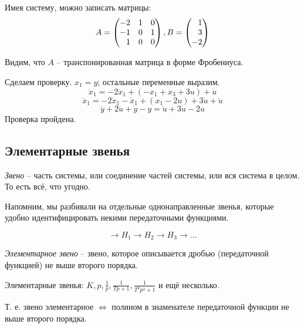 \documentclass[main.tex]{subfiles}
\begin{document}
Имея систему, можно записать матрицы:
\[ A = \begin{pmatrix}
    - 2 & 1 & 0 \\
    -1 & 0 & 1 \\
    \phm 1 & 0 & 0
\end{pmatrix}, B = \begin{pmatrix}
\phm 1 \\ \phm 3 \\ -2
\end{pmatrix} \]

Видим, что $ A $ -- транспонированная матрица в форме Фробениуса.

Сделаем проверку.
$ x_1 = y $; остальные переменные выразим.
\[ \ddot x_1 = -2 \dot x_1 + (- x_1 + x_3 + 3u) + \dot u \]
\[ \dddot x_1 = - 2 \ddot x_1 - \dot x_1 + (x_1 - 2 u) + 3 \dot u + \ddot u \]
\[\dddot y + 2 \ddot u + \dot y - y = \ddot u + 3 \dot u - 2 u  \]
Проверка пройдена.

\subsection{Элементарные звенья}

\emph{Звено} -- часть системы, или соединение частей системы, или вся система в целом.
То есть всё, что угодно.

Напомним, мы разбивали на отдельные однонаправленные звенья, которые удобно идентифицировать некими передаточными функциями.

\[ \to \boxed{H_1} \to \boxed{H_2} \to \boxed{H_3} \to ... \]

\emph{Элементарное звено} -- звено, которое описывается дробью (передаточной функцией) не выше второго порядка.

Элементарные звенья: $ K, p, \frac{1}{p}, \frac{1}{Tp+1}, \frac{1}{T^2p^2 + 1} $ и ещё несколько.

Т. е. звено элементарное $ \Leftrightarrow $ полином в знаменателе передаточной функции не выше второго порядка.
\end{document}
